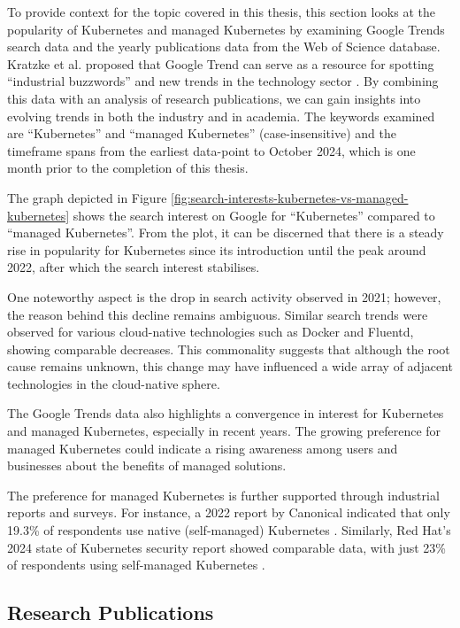 To provide context for the topic covered in this thesis, this section looks at the popularity of Kubernetes and managed Kubernetes by examining Google Trends search data and the yearly publications data from the Web of Science database. Kratzke et al. proposed that Google Trend can serve as a resource for spotting “industrial buzzwords” and new trends in the technology sector \cite{kratzkeUnderstandingCloudnativeApplications2017}. By combining this data with an analysis of research publications, we can gain insights into evolving trends in both the industry and in academia. The keywords examined are “Kubernetes” and “managed Kubernetes” (case-insensitive) and the timeframe spans from the earliest data-point to October 2024, which is one month prior to the completion of this thesis.

The graph depicted in Figure \ref{fig:search-interests-kubernetes-vs-managed-kubernetes} shows the search interest on Google for “Kubernetes” compared to “managed Kubernetes”. From the plot, it can be discerned that there is a steady rise in popularity for Kubernetes since its introduction until the peak around 2022, after which the search interest stabilises.

One noteworthy aspect is the drop in search activity observed in 2021; however, the reason behind this decline remains ambiguous. Similar search trends were observed for various cloud-native technologies such as Docker and Fluentd, showing comparable decreases. This commonality suggests that although the root cause remains unknown, this change may have influenced a wide array of adjacent technologies in the cloud-native sphere.

The Google Trends data also highlights a convergence in interest for Kubernetes and managed Kubernetes, especially in recent years. The growing preference for managed Kubernetes could indicate a rising awareness among users and businesses about the benefits of managed solutions.

The preference for managed Kubernetes is further supported through industrial reports and surveys. For instance, a 2022 report by Canonical indicated that only 19.3\% of respondents use native (self-managed) Kubernetes \cite{canonicalKubernetesCloudNative2022}. Similarly, Red Hat's 2024 state of Kubernetes security report showed comparable data, with just 23\% of respondents using self-managed Kubernetes \cite{redhatinc.StateKubernetesSecurity2024}.

\subsection{Research Publications}


